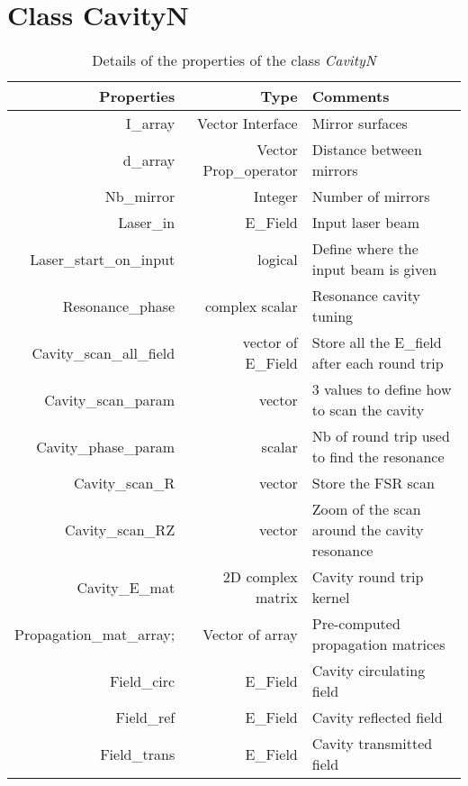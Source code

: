 \section{Class CavityN}

\begin{table}
  \centering
  \caption{\label{App3:CavityN} Details of the properties of the class \textsl{CavityN} }
\begin{tabular}{|r r l|}
\hline
{\Large\strut} Properties & Type &  Comments \\
\hline
{\Large\strut} I\_array &  Vector Interface & Mirror surfaces \\
{\Large\strut} d\_array &  Vector Prop\_operator & Distance between mirrors \\
{\Large\strut} Nb\_mirror &  Integer & Number of mirrors \\
{\Large\strut} Laser\_in &  E\_Field & Input laser beam \\
{\Large\strut} Laser\_start\_on\_input &  logical  & Define where the input beam is given \\
{\Large\strut} Resonance\_phase &  complex scalar &  Resonance cavity tuning \\
{\Large\strut} Cavity\_scan\_all\_field & vector of E\_Field  &  Store all the E\_field after each round trip \\
{\Large\strut} Cavity\_scan\_param &  vector &  3 values to define how to scan the cavity \\
{\Large\strut} Cavity\_phase\_param &  scalar & Nb of round trip used to find the resonance \\
{\Large\strut} Cavity\_scan\_R &  vector  & Store the FSR scan  \\
{\Large\strut} Cavity\_scan\_RZ &  vector &  Zoom of the scan around the cavity resonance \\
{\Large\strut} Cavity\_E\_mat &  2D complex matrix &  Cavity round trip kernel \\
{\Large\strut} Propagation\_mat\_array; & Vector of array & Pre-computed propagation matrices \\
{\Large\strut} Field\_circ &  E\_Field &  Cavity circulating field \\
{\Large\strut} Field\_ref &  E\_Field & Cavity reflected field  \\
{\Large\strut} Field\_trans &  E\_Field & Cavity transmitted field  \\
\hline
\end{tabular}
\end{table}


